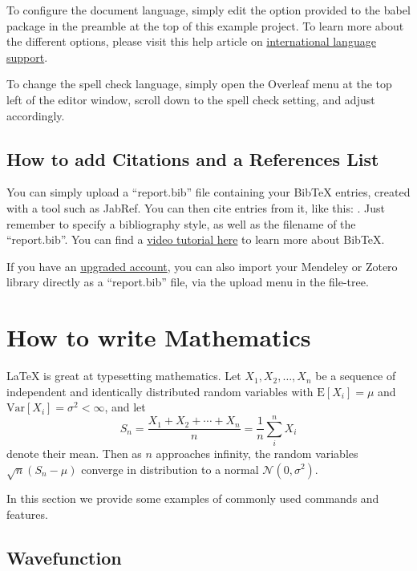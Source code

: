 \documentclass{article}
\begin{document}
To configure the document language, simply edit the option provided to the babel
package in the preamble at the top of this example project. To learn more about
the different options, please visit this help article on
\href{https://www.overleaf.com/learn/latex/International_language_support}{international
language support}.

To change the spell check language, simply open the Overleaf menu at the top
left of the editor window, scroll down to the spell check setting, and adjust
accordingly.

\subsection{How to add Citations and a References List}

You can simply upload a ``report.bib'' file containing your BibTeX entries,
created with a tool such as JabRef. You can then cite entries from it, like
this: \cite{greenwade93}. Just remember to specify a bibliography style, as well
as the filename of the ``report.bib''. You can find a
\href{https://www.overleaf.com/help/97-how-to-include-a-bibliography-using-bibtex}{video
tutorial here} to learn more about BibTeX.

If you have an \href{https://www.overleaf.com/user/subscription/plans}{upgraded
account}, you can also import your Mendeley or Zotero library directly as a
``report.bib'' file, via the upload menu in the file-tree.



\section{How to write Mathematics}

\LaTeX{} is great at typesetting mathematics. Let $X_1, X_2, \ldots, X_n$ be a
sequence of independent and identically distributed random variables with
$\text{E}[X_i] = \mu$ and $\text{Var}[X_i] = \sigma^2 < \infty$, and let
\begin{equation*}
    S_n = \frac{X_1 + X_2 + \cdots + X_n}{n} = \frac{1}{n}\sum_{i}^{n} X_i
\end{equation*}
denote their mean. Then as $n$ approaches infinity, the random variables
$\sqrt{n}(S_n - \mu)$ converge in distribution to a normal $\mathcal{N}(0,
\sigma^2)$.

In this section we provide some examples of commonly used commands and features.

\subsection{Wavefunction} \label{sec:wavefunction}
\end{document}
